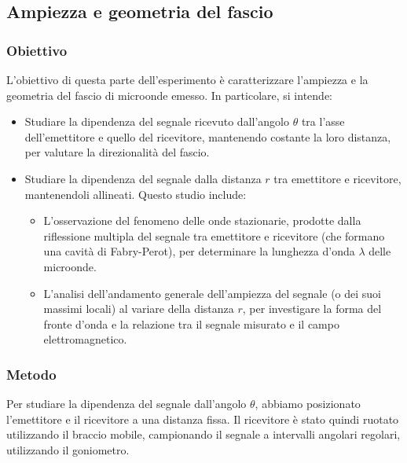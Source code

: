 \documentclass[a4paper]{article}
\begin{document}
\subsection{Ampiezza e geometria del fascio}

\subsubsection{Obiettivo}
L'obiettivo di questa parte dell'esperimento è caratterizzare l'ampiezza e la geometria del fascio di microonde emesso. In particolare, si intende:
\begin{itemize}
    \item Studiare la dipendenza del segnale ricevuto dall'angolo $\theta$ tra l'asse dell'emettitore e quello del ricevitore, mantenendo costante la loro distanza, per valutare la direzionalità del fascio.
    \item Studiare la dipendenza del segnale dalla distanza $r$ tra emettitore e ricevitore, mantenendoli allineati. Questo studio include:
    \begin{itemize}
        \item L'osservazione del fenomeno delle onde stazionarie, prodotte dalla riflessione multipla del segnale tra emettitore e ricevitore (che formano una cavità di Fabry-Perot), per determinare la lunghezza d'onda $\lambda$ delle microonde.
        \item L'analisi dell'andamento generale dell'ampiezza del segnale (o dei suoi massimi locali) al variare della distanza $r$, per investigare la forma del fronte d'onda e la relazione tra il segnale misurato e il campo elettromagnetico.
    \end{itemize}
\end{itemize}

\subsubsection{Metodo}
Per studiare la dipendenza del segnale dall'angolo $\theta$, abbiamo posizionato l'emettitore e il ricevitore a una distanza fissa. Il ricevitore è stato quindi ruotato utilizzando il braccio mobile, campionando il segnale a intervalli angolari regolari, utilizzando il goniometro.
\end{document}
